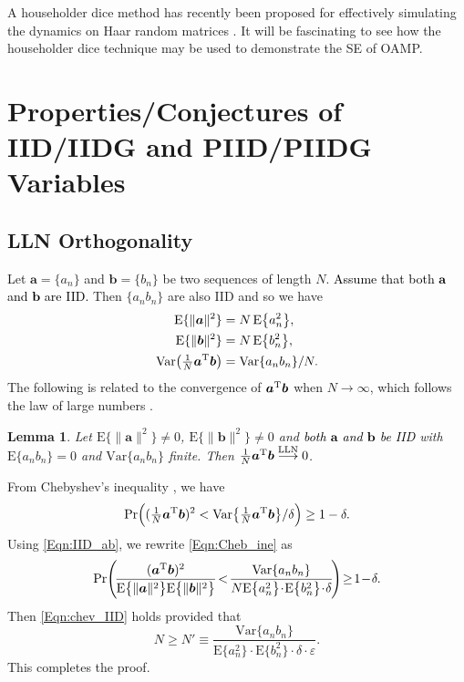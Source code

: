 \documentclass[journal]{IEEEtran}
\newcommand{\mr}{\mathrm}
\newcommand{\BE}{\begin{equation}}
\newcommand{\EE}{\end{equation}}
\newcommand{\BS}{\begin{subequations}}
\newcommand{\ES}{\end{subequations}}
\renewcommand{\bf}{\bm}
\newtheorem{lemma}[theorem]{Lemma}
\newcommand{\LLC}[1]{\textcolor{black}{#1}}%
\begin{document}
A householder dice method has recently been proposed for effectively simulating the dynamics on Haar random matrices \cite{Lu2021}. It will be fascinating to see how the householder dice technique may be used to demonstrate the SE of OAMP. 
 
\appendices  
\section{Properties/Conjectures of IID/IIDG and PIID/PIIDG Variables}\label{APP:Pro_PIIDG}


\subsection{LLN Orthogonality} 
Let $\bf{a}=\{a_n\}$ and $\bf{b}=\{b_n\}$ be two sequences of length $N$.  \LLC{Assume that both $\bf{a}$ and $\bf{b}$ are IID.} Then $\{a_n b_n\}$ are also IID and so we have 
\BS\label{Eqn:IID_ab}\begin{align}
    \mr{E}\{\|\bf{a}\|^2\} &= N\,\mr{E}\big\{a_n^2\big\},\\
     \mr{E}\{\|\bf{b}\|^2\} &= N\,\mr{E}\big\{b_n^2\big\},\\
     \mr{Var}\big(\tfrac{1}{N}\bf{a}^{\rm T}\bf{b}\big)&= \mr{Var}\{ a_n b_n\}/N.
\end{align}\ES
The following is related to the convergence of $\bf{a}^{\rm T}\bf{b}$ when $N\to\infty$, which follows the law of large numbers \cite{Dekking2005}.  

\begin{lemma}\label{Pro:Chev_IID}
Let $\mr{E}\{\|\bf{a}\|^2\}\neq 0$,  $\mr{E}\{\|\bf{b}\|^2\}\neq 0$ and \LLC{both $\bf{a}$ and $\bf{b}$ be IID} with $ \mr{E}\{a_n b_n\}=0$ and  $ \mr{Var}\{ a_n b_n\}$ finite. Then  $\tfrac{1}{N}\bf{a}^{\rm T}\bf{b} \overset{\rm LLN}{\longrightarrow}0$.
\end{lemma}

\begin{IEEEproof}
From Chebyshev's inequality \cite{Dekking2005}, we have
\BE\label{Eqn:Cheb_ine}
\mr{Pr}\Big( (\tfrac{1}{N}\bf{a}^{\rm T}\bf{b})^2 < \mr{Var} \big\{\tfrac{1}{N}\bf{a}^{\rm T}\bf{b}\big\}/\delta \Big) \ge 1-\delta.
\EE
Using \eqref{Eqn:IID_ab}, we rewrite \eqref{Eqn:Cheb_ine} as
\BE\label{Eqn:P8}
\mr{Pr}\!\left(\! \frac{(\bf{a}^{\rm T}\bf{b})^2}{\mr{E}\big\{\|\bf{a}\|^2\big\}\mr{E}\big\{\|\bf{b}\|^2\big\}} \!<\! \frac{\mr{Var}\{ a_n b_n\}}{N\mr{E}\big\{a_n^2\big\}\!\cdot\!\mr{E}\big\{b_n^2\big\}\!\cdot\!\delta}\!\right)\! \ge \!1\!-\!\delta.
\EE
Then \eqref{Eqn:chev_IID} holds provided that
\BE
N\ge N' \equiv  \frac{\mr{Var}\{ a_n b_n\}}{ \mr{E}\big\{a_n^2\big\}\!\cdot\!\mr{E}\big\{b_n^2\big\}\!\cdot\!\delta\!\cdot\! \varepsilon}.
\EE
This completes the proof.
\end{IEEEproof}
\end{document}
